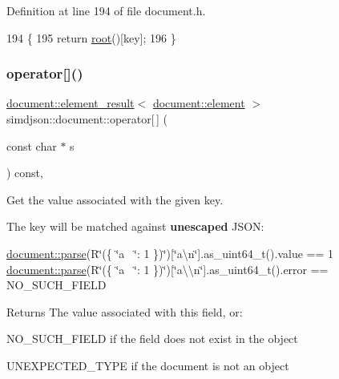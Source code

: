 Definition at line 194 of file document.\+h.


\begin{DoxyCode}
194                                                                                                            
       \{
195   \textcolor{keywordflow}{return} \hyperlink{classsimdjson_1_1document_ad240c2d93c83c378e8220e667d0bdee2}{root}()[key];
196 \}
\end{DoxyCode}
\mbox{\label{classsimdjson_1_1document_a6fb3f0bf2ff7c1453c05f43132ba112e}} 
\subsubsection{\texorpdfstring{operator[]()}{operator[]()}\hspace{0.1cm}{\footnotesize\ttfamily [2/2]}}
{\footnotesize\ttfamily \hyperlink{classsimdjson_1_1document_1_1element__result}{document\+::element\+\_\+result}$<$ \hyperlink{classsimdjson_1_1document_1_1element}{document\+::element} $>$ simdjson\+::document\+::operator\mbox{[}$\,$\mbox{]} (\begin{DoxyParamCaption}\item[{const char $\ast$}]{s }\end{DoxyParamCaption}) const\hspace{0.3cm}{\ttfamily [inline]}, {\ttfamily [noexcept]}}



Get the value associated with the given key. 

The key will be matched against {\bfseries unescaped} J\+S\+ON\+:

\hyperlink{classsimdjson_1_1document_a6f11cda7c4a06fffdc00fdc97d98ae2b}{document\+::parse}(R\char`\"{}(\{ \char`\"{}a~\newline
\char`\"{}\+: 1 \})\char`\"{})\mbox{[}\char`\"{}a\textbackslash{}n\char`\"{}\mbox{]}.as\+\_\+uint64\+\_\+t().value == 1 \hyperlink{classsimdjson_1_1document_a6f11cda7c4a06fffdc00fdc97d98ae2b}{document\+::parse}(R\char`\"{}(\{ \char`\"{}a~\newline
\char`\"{}\+: 1 \})\char`\"{})\mbox{[}\char`\"{}a\textbackslash{}\textbackslash{}n\char`\"{}\mbox{]}.as\+\_\+uint64\+\_\+t().error == N\+O\+\_\+\+S\+U\+C\+H\+\_\+\+F\+I\+E\+LD

\begin{DoxyReturn}{Returns}
The value associated with this field, or\+:
\begin{DoxyItemize}
\item N\+O\+\_\+\+S\+U\+C\+H\+\_\+\+F\+I\+E\+LD if the field does not exist in the object
\item U\+N\+E\+X\+P\+E\+C\+T\+E\+D\+\_\+\+T\+Y\+PE if the document is not an object 
\end{DoxyItemize}
\end{DoxyReturn}


